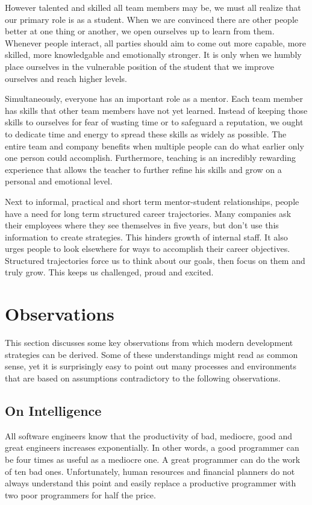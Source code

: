 \documentclass[twocolumn]{paper}
\begin{document}
However talented and skilled all team members may be, we must all
realize that our primary role is as a student. When we are convinced
there are other people better at one thing or another, we open
ourselves up to learn from them. Whenever people interact, all
parties should aim to come out more capable, more skilled, more
knowledgable and emotionally stronger. It is only when we humbly
place ourselves in the vulnerable position of the student that we
improve ourselves and reach higher levels.

Simultaneously, everyone has an important role as a mentor. Each
team member has skills that other team members have not yet learned.
Instead of keeping those skills to ourselves for fear of wasting
time or to safeguard a reputation, we ought to dedicate time and
energy to spread these skills as widely as possible. The entire team
and company benefits when multiple people can do what earlier only
one person could accomplish. Furthermore, teaching is an incredibly
rewarding experience that allows the teacher to further refine his
skills and grow on a personal and emotional level.

Next to informal, practical and short term mentor-student
relationships, people have a need for long term structured career
trajectories. Many companies ask their employees where they see
themselves in five years, but don't use this information to create
strategies. This hinders growth of internal staff. It also urges
people to look elsewhere for ways to accomplish their career
objectives. Structured trajectories force us to think about our
goals, then focus on them and truly grow. This keeps us challenged,
proud and excited.

\section{Observations}

This section discusses some key observations from which modern
development strategies can be derived. Some of these understandings
might read as common sense, yet it is surprisingly easy to point out
many processes and environments that are based on assumptions
contradictory to the following observations.

\subsection{On Intelligence}

All software engineers know that the productivity of bad, mediocre,
good and great engineers increases exponentially. In other words, a
good programmer can be four times as useful as a mediocre one. A
great programmer can do the work of ten bad ones. Unfortunately,
human resources and financial planners do not always understand this
point and easily replace a productive programmer with two poor
programmers for half the price.
\end{document}
